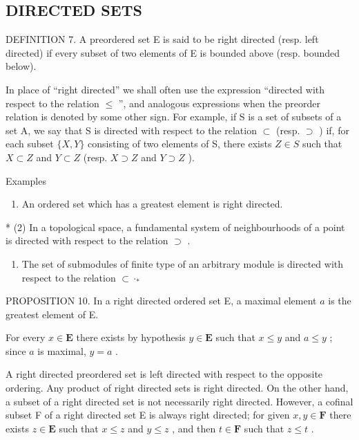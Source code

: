 \subsection{DIRECTED SETS}

DEFINITION 7. A preordered set E is said to be right directed (resp. left directed) if every subset of two elements of E is bounded above (resp. bounded below).

In place of ``right directed'' we shall often use the expression ``directed with respect to the relation \(\leqslant\) '', and analogous expressions when the preorder relation is denoted by some other sign. For example, if S is a set of subsets of a set A, we say that S is directed with respect to the relation \(\subset\) (resp. \(\supset\) ) if, for each subset \(\{X, Y\}\) consisting of two elements of S, there exists \(Z \in S\) such that \(X \subset Z\) and \(Y \subset Z\) (resp. \(X \supset Z\) and \(Y \supset Z\) ).

Examples

\begin{enumerate}
\def\labelenumi{(\arabic{enumi})}
\tightlist
\item
  An ordered set which has a greatest element is right directed.
\end{enumerate}

* (2) In a topological space, a fundamental system of neighbourhoods of a point is directed with respect to the relation \(\supset\) .

\begin{enumerate}
\def\labelenumi{(\arabic{enumi})}
\setcounter{enumi}{2}
\tightlist
\item
  The set of submodules of finite type of an arbitrary module is directed with respect to the relation \(\subset\cdot_{*}\)
\end{enumerate}

PROPOSITION 10. In a right directed ordered set E, a maximal element \(a\) is the greatest element of E.

For every \(x \in \mathbf{E}\) there exists by hypothesis \(y \in \mathbf{E}\) such that \(x \leqslant y\) and \(a \leqslant y\) ; since \(a\) is maximal, \(y = a\) .

A right directed preordered set is left directed with respect to the opposite ordering. Any product of right directed sets is right directed. On the other hand, a subset of a right directed set is not necessarily right directed. However, a cofinal subset F of a right directed set E is always right directed; for given \(x, y \in \mathbf{F}\) there exists \(z \in \mathbf{E}\) such that \(x \leqslant z\) and \(y \leqslant z\) , and then \(t \in \mathbf{F}\) such that \(z \leqslant t\) .

